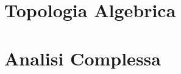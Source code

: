 \documentclass[a4paper, twoside]{book}
\begin{document}
\part{Topologia Algebrica}




\part{Analisi Complessa}












%

%
%
\end{document}
